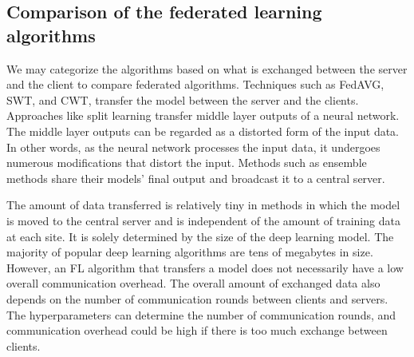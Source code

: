\subsection{Comparison of the federated learning algorithms}
We may categorize the algorithms based on what is exchanged between the server and the client to compare federated algorithms. Techniques such as FedAVG, SWT, and CWT, transfer the model between the server and the clients. Approaches like split learning \cite{poirot2019split}  transfer middle layer outputs of a neural network. The middle layer outputs can be regarded as a distorted form of the input data. In other words, as the neural network processes the input data, it undergoes numerous modifications that distort the input. Methods such as ensemble methods share their models' final output and broadcast it to a central server. 

The amount of data transferred is relatively tiny in methods in which the model is moved to the central server and is independent of the amount of training data at each site. It is solely determined by the size of the deep learning model. The majority of popular deep learning algorithms are tens of megabytes in size. However, an FL algorithm that transfers a model does not necessarily have a low overall communication overhead. The overall amount of exchanged data also depends on the number of communication rounds between clients and servers. The hyperparameters can determine the number of communication rounds, and communication overhead could be high if there is too much exchange between clients.





